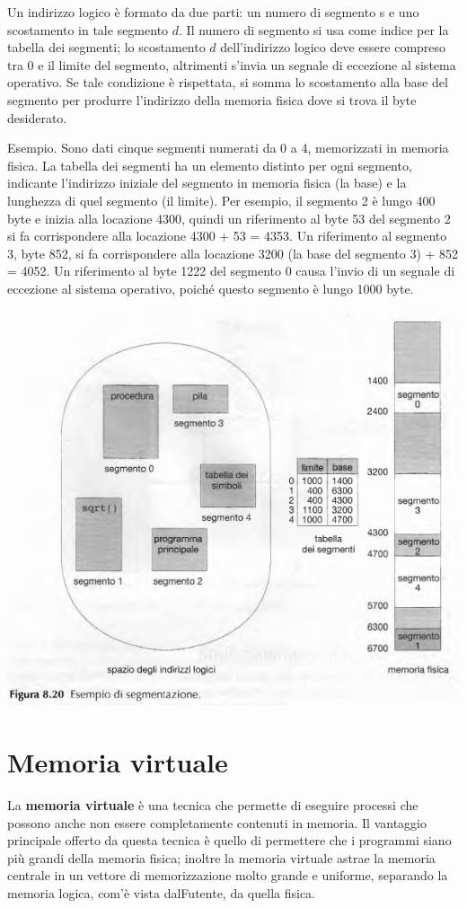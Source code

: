 \documentclass[11pt,a4paper]{article}
\begin{document}
Un indirizzo logico è for­mato da due parti: un numero di segmento s e uno scostamento in tale segmento $d$. Il nu­mero di segmento si usa come indice per la tabella dei segmenti; lo scostamento $d$ dell'indirizzo logico deve essere compreso tra 0 e il limite del segmento, altrimenti s'invia un segna­le di eccezione al sistema operativo. Se tale condizione è rispettata, si somma lo scostamento alla base del segmento
per produrre l'indirizzo della memoria fisica dove si trova il byte desiderato.

Esempio. Sono dati
cinque segmenti numerati da 0 a 4, memorizzati in memoria fisica. La tabella dei segmenti
ha un elemento distinto per ogni segmento, indicante l'indirizzo iniziale del segmento in
memoria fisica (la base) e la lunghezza di quel segmento (il limite). Per esempio, il segmen­to 2 è lungo 400 byte e inizia alla locazione 4300, quindi un riferimento al byte 53 del seg­mento 2 si fa corrispondere alla locazione 4300 + 53 = 4353. Un riferimento al segmento 3,
byte 852, si fa corrispondere alla locazione 3200 (la base del segmento 3) + 852 = 4052. Un
riferimento al byte 1222 del segmento 0 causa l'invio di un segnale di eccezione al sistema
operativo, poiché questo segmento è lungo 1000 byte.
\begin{center}
  \includegraphics[scale=0.6]{img/0040.png}
\end{center}

\section{Memoria virtuale}
La \textbf{memoria virtuale} è una tecnica che permette di eseguire processi che possono an­che non essere completamente contenuti in memoria. Il vantaggio principale offerto da
questa tecnica è quello di permettere che i programmi siano più grandi della memoria fisica; inoltre la memoria virtuale astrae la memoria centrale in un vettore di memorizzazione
molto grande e uniforme, separando la memoria logica, com'è vista dalFutente, da quella fisica.
\end{document}
